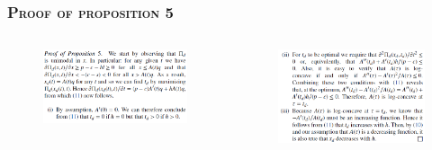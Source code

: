 \documentclass[aspectratio=169]{../presentation}
\begin{document}
    \begin{frame}
        \frametitle{\textsc{Proof of proposition 5}}

        \begin{columns}
            \begin{column}{0.5\linewidth}
                \begin{figure}[h]
                    \includegraphics[width=\linewidth]{imgs/gp01-7.png}
                \end{figure}
            \end{column}
            \begin{column}{0.5\linewidth}
                \begin{figure}[h]
                    \includegraphics[width=\linewidth]{imgs/gp01-8.png}
                \end{figure}
            \end{column}
        \end{columns}

    \end{frame}
\end{document}
